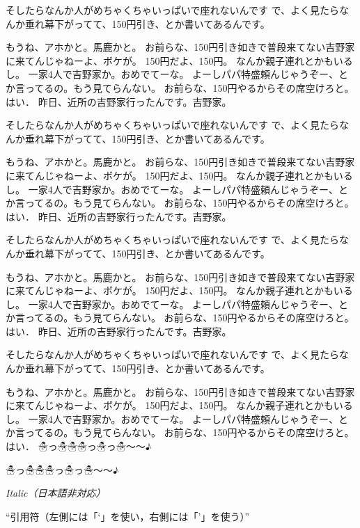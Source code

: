 \documentclass[twocolumn, lualatex, ja=standard]{bxjsarticle}
\begin{document}
そしたらなんか人がめちゃくちゃいっぱいで座れないんです
で、よく見たらなんか垂れ幕下がってて、150円引き、とか書いてあるんです。

もうね、アホかと。馬鹿かと。
お前らな、150円引き如きで普段来てない吉野家に来てんじゃねーよ、ボケが。
150円だよ、150円。
なんか親子連れとかもいるし。
一家4人で吉野家か。おめでてーな。
よーしパパ特盛頼んじゃうぞー、とか言ってるの。もう見てらんない。
お前らな、150円やるからその席空けろと。はい．
昨日、近所の吉野家行ったんです。吉野家。

そしたらなんか人がめちゃくちゃいっぱいで座れないんです
で、よく見たらなんか垂れ幕下がってて、150円引き、とか書いてあるんです。

もうね、アホかと。馬鹿かと。
お前らな、150円引き如きで普段来てない吉野家に来てんじゃねーよ、ボケが。
150円だよ、150円。
なんか親子連れとかもいるし。
一家4人で吉野家か。おめでてーな。
よーしパパ特盛頼んじゃうぞー、とか言ってるの。もう見てらんない。
お前らな、150円やるからその席空けろと。はい．
昨日、近所の吉野家行ったんです。吉野家。

そしたらなんか人がめちゃくちゃいっぱいで座れないんです
で、よく見たらなんか垂れ幕下がってて、150円引き、とか書いてあるんです。

もうね、アホかと。馬鹿かと。
お前らな、150円引き如きで普段来てない吉野家に来てんじゃねーよ、ボケが。
150円だよ、150円。
なんか親子連れとかもいるし。
一家4人で吉野家か。おめでてーな。
よーしパパ特盛頼んじゃうぞー、とか言ってるの。もう見てらんない。
お前らな、150円やるからその席空けろと。はい．
昨日、近所の吉野家行ったんです。吉野家。

そしたらなんか人がめちゃくちゃいっぱいで座れないんです
で、よく見たらなんか垂れ幕下がってて、150円引き、とか書いてあるんです。

もうね、アホかと。馬鹿かと。
お前らな、150円引き如きで普段来てない吉野家に来てんじゃねーよ、ボケが。
150円だよ、150円。
なんか親子連れとかもいるし。
一家4人で吉野家か。おめでてーな。
よーしパパ特盛頼んじゃうぞー、とか言ってるの。もう見てらんない。
お前らな、150円やるからその席空けろと。はい．
☃っ☃☃☃っ☃っ☃～～♪

☃っ☃☃☃っ☃っ☃～～♪

\textit{Italic（日本語非対応）}

``引用符（左側には「`」を使い，右側には「'」を使う）''
\end{document}
